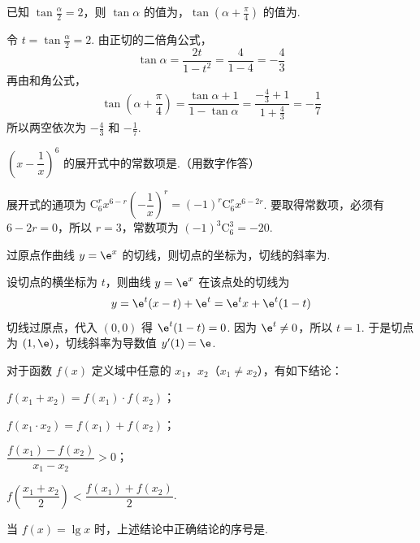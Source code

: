 \begin{problem}
已知 \(\tan\frac{\alpha}{2}=2\)，则 \(\tan\alpha\) 的值为\fillinblank{}，\(\tan\left(\alpha+\frac{\pi}{4}\right)\) 的值为\fillinblank{}.
\end{problem}

\begin{solution}
令 \(t=\tan\frac{\alpha}{2}=2\). 由正切的二倍角公式，
\[
\tan\alpha=\frac{2t}{1-t^2}=\frac4{1-4}=-\frac43
\]
再由和角公式，
\[
\tan\left(\alpha+\frac\pi4\right)=\frac{\tan\alpha+1}{1-\tan\alpha}=\frac{-\frac43+1}{1+\frac43}=-\frac17
\]
所以两空依次为 \(-\frac43\) 和 \(-\frac17\).
\end{solution}

\begin{problem}
\(\left(x-\dfrac{1}{x}\right)^6\) 的展开式中的常数项是\fillinblank{}.（用数字作答）
\end{problem}

\begin{solution}
展开式的通项为 \(\mathrm C_6^r x^{6-r}\left(-\dfrac{1}{x}\right)^r=(-1)^r\mathrm C_6^r x^{6-2r}\). 要取得常数项，必须有 \(6-2r=0\)，所以 \(r=3\)，常数项为 \((-1)^3\mathrm C_6^3=-20\).
\end{solution}

\begin{problem}
过原点作曲线 \(y=\e^x\) 的切线，则切点的坐标为\fillinblank{}，切线的斜率为\fillinblank{}.
\end{problem}

\begin{solution}
设切点的横坐标为 \(t\)，则曲线 \(y=\e^x\) 在该点处的切线为
\[
y=\e^t(x-t)+\e^t=\e^t x+\e^t(1-t)
\]
切线过原点，代入 \((0,0)\) 得 \(\e^t(1-t)=0\). 因为 \(\e^t\ne0\)，所以 \(t=1\). 于是切点为 \((1,\e)\)，切线斜率为导数值 \(y'(1)=\e\).
\end{solution}

\begin{problem}
对于函数 \(f(x)\) 定义域中任意的 \(x_1\)，\(x_2\)（\(x_1\neq x_2\)），有如下结论：

\begin{circlelist}
\item \(f(x_1+x_2)=f(x_1)\cdot f(x_2)\)；
\item \(f(x_1\cdot x_2)=f(x_1)+f(x_2)\)；
\item \(\dfrac{f(x_1)-f(x_2)}{x_1-x_2}>0\)；
\item \(f\left(\dfrac{x_1+x_2}{2}\right)<\dfrac{f(x_1)+f(x_2)}{2}\).
\end{circlelist}

当 \(f(x)=\lg x\) 时，上述结论中正确结论的序号是\fillinblank{}.
\end{problem}

